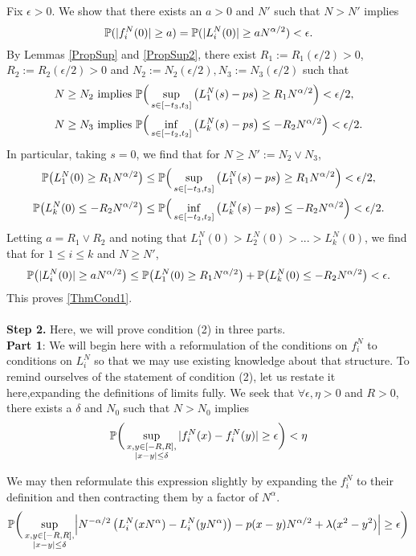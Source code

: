 	Fix $\epsilon>0$. We show that there exists an $a>0$ and $N'$ such that $N>N'$ implies
	$$\mathbb{P}(|f^N_i(0)|\geq a) = \mathbb{P}(|L_i^N(0)|\geq a N^{\alpha/2})<\epsilon.$$
	By Lemmas \ref{PropSup} and \ref{PropSup2}, there exist $R_1 := R_1(\epsilon/2)>0$, $R_2 := R_2(\epsilon/2)>0$ and $N_2 := N_2(\epsilon/2),N_3 := N_3(\epsilon/2)$ such that 
	\begin{align*}
	N\geq N_2 &\text{ implies } \mathbb{P}\Big(\sup_{s\in[-t_3,t_3]}\left(L_1^N(s)-ps\right)\geq R_1N^{\alpha/2}\Big)<\epsilon/2,\\
	N\geq N_3 &\text{ implies } \mathbb{P}\Big(\inf_{s\in[-t_2,t_2]}\left(L_k^N(s)-ps\right)\leq -R_2 N^{\alpha/2}\Big)<\epsilon/2.
	\end{align*}
	In particular, taking $s=0$, we find that for $N\geq N' := N_2 \vee N_3$, 
	\begin{align*}
	\mathbb{P}\big(L_1^N(0)\geq R_1N^{\alpha/2}\big) &\leq \mathbb{P}\Big(\sup_{s\in[-t_3,t_3]}\left(L_1^N(s)-ps\right)\geq R_1N^{\alpha/2}\Big)< \epsilon/2,\\
	\mathbb{P}\big(L_k^N(0)\leq -R_2N^{\alpha/2}\big) &\leq \mathbb{P}\Big(\inf_{s\in[-t_2,t_2]}\left(L_k^N(s)-ps\right)\leq -R_2N^{\alpha/2}\Big)< \epsilon/2.
	\end{align*}
	Letting $a = R_1 \vee R_2$ and noting that $L_1^N(0)>L_2^N(0)>...>L_k^N(0)$, we find that for $1\leq i\leq k$ and $N \geq N'$,
	$$\mathbb{P}\big(|L_i^N(0)|\geq a N^{\alpha/2}\big)\leq \mathbb{P}\big(L_1^N(0)\geq R_1 N^{\alpha/2}\big) + \mathbb{P}\big(L_k^N(0)\leq -R_2N^{\alpha/2}\big) < \epsilon.$$
	This proves \eqref{ThmCond1}.\\\\\noindent
	\textbf{Step 2.} Here, we will prove condition (2) in three parts.\\
	\textbf{Part 1}: 
	We will begin here with a reformulation of the conditions on $f_i^N$ to conditions on $L_i^N$ so that we may use existing knowledge about that structure. To remind ourselves of the statement of condition (2), let us restate it here,expanding the definitions of limits fully. We seek that $\forall \epsilon,\eta>0$ and $R>0$, there exists a $\delta$ and $N_0$ such that $N>N_0$ implies 
	\[
	\mathbb{P}\bigg(\sup_{\substack{x,y\in [-R,R],\\ |x-y|\leq\delta}} |f^N_i(x) - f^N_i(y)| \geq \epsilon\bigg)<\eta
	\]
	
	We may then reformulate this expression slightly by expanding the $f_i^N$ to their definition and then contracting them by a factor of $N^\alpha$. 
	\begin{align}
	\pr\bigg(\sup_{\substack{x,y\in [-R,R],\\ |x-y|\leq\delta}} \abs*{N^{-\alpha/2}\left(L^N_i(xN^{\alpha}) - L^N_i(yN^\alpha)\right)-p(x-y)N^{\alpha/2}+\lambda(x^2-y^2)} \geq \epsilon\bigg)
	\end{align}
	
